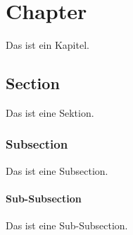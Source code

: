 \chapter{Chapter}
\label{ch:chapter}

Das ist ein Kapitel.

\section{Section}
\label{sec:section}

Das ist eine Sektion.

\subsection{Subsection}
\label{ssec:subsection}

Das ist eine Subsection.

\subsubsection{Sub-Subsection}
\label{sssec:subsection}

Das ist eine Sub-Subsection.
